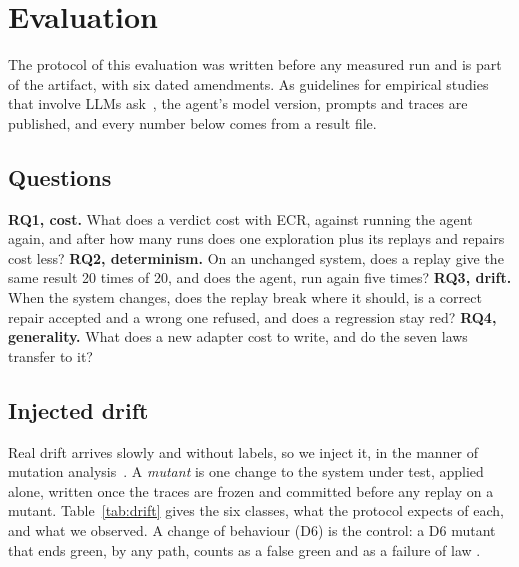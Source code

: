 \section{Evaluation}
\label{sec:evaluation}

The protocol of this evaluation was written before any measured run and is part of the artifact, with six dated amendments. As guidelines for empirical studies that involve LLMs ask~\cite{baltes2025guidelines}, the agent's model version, prompts and traces are published, and every number below comes from a result file.

\subsection{Questions}

\textbf{RQ1, cost.} What does a verdict cost with ECR, against running the agent again, and after how many runs does one exploration plus its replays and repairs cost less? \textbf{RQ2, determinism.} On an unchanged system, does a replay give the same result 20 times of 20, and does the agent, run again five times? \textbf{RQ3, drift.} When the system changes, does the replay break where it should, is a correct repair accepted and a wrong one refused, and does a regression stay red? \textbf{RQ4, generality.} What does a new adapter cost to write, and do the seven laws transfer to it?

\subsection{Injected drift}

Real drift arrives slowly and without labels, so we inject it, in the manner of mutation analysis~\cite{jia2011mutation}. A \emph{mutant} is one change to the system under test, applied alone, written once the traces are frozen and committed before any replay on a mutant. Table~\ref{tab:drift} gives the six classes, what the protocol expects of each, and what we observed. A change of behaviour (\textsf{D6}) is the control: a \textsf{D6} mutant that ends green, by any path, counts as a false green and as a failure of law .


